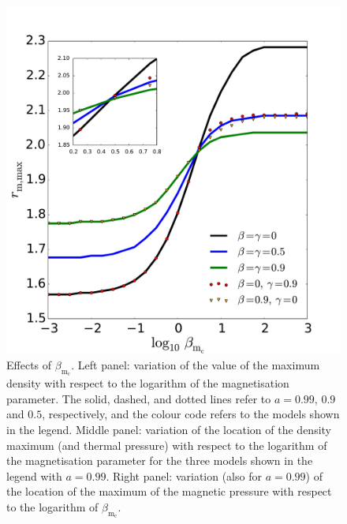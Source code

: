 \documentclass[referee]{aa}
\begin{document}
\begin{figure}
\hspace{-0.2cm}
\includegraphics[scale=0.14]{figures/fig6c.pdf}
\caption{Effects of $\beta_{\mathrm{m}_{\mathrm{c}}}$. Left panel: variation of the value of the maximum density with respect to the logarithm of the magnetisation parameter. The solid, dashed, and dotted lines refer to $a = 0.99$, $0.9$ and $0.5$, respectively, and the colour code refers to the models shown in the legend. Middle panel: variation of the location of the density maximum (and thermal pressure) with respect to the logarithm of the magnetisation parameter for the three models shown in the legend with $a = 0.99$. Right panel: variation (also for $a = 0.99$) of the location of the maximum of the magnetic pressure with respect to the logarithm of $\beta_{\mathrm{m}_{\mathrm{c}}}$.}
           \label{max-vs-magnetisation}%
 \end{figure}
 
\end{document}
